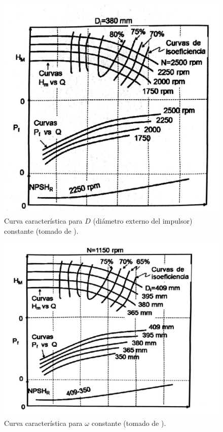 \documentclass[11pt, oneside]{article}
\begin{document}
\begin{figure}[h]
\centering
\includegraphics[width=12cm]{./figs/bom7.jpeg}
\caption{Curva caracter\'istica para $D$ (di\'ametro externo del impulsor) constante (tomado de \cite{agudelo2011mecanica}).} 
\label{bom7}
\end{figure}


\begin{figure}[h]
\centering
\includegraphics[width=12cm]{./figs/bom6.jpeg}
\caption{Curva caracter\'istica para $\omega$ constante (tomado de \cite{agudelo2011mecanica}).} 
\label{bom6}
\end{figure}
\end{document}
